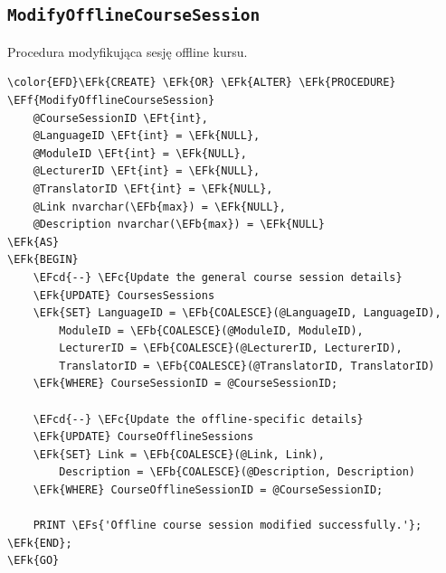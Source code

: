 \documentclass[11pt]{article}
\newcommand{\EFc}[1]{\textcolor{EFc}{\textit{#1}}} %
\newcommand{\EFcd}[1]{\textcolor{EFcd}{\textit{#1}}} %
\newcommand{\EFs}[1]{\textcolor{EFs}{#1}} %
\newcommand{\EFk}[1]{\textcolor{EFk}{\textbf{#1}}} %
\newcommand{\EFb}[1]{\textcolor{EFb}{\textbf{#1}}} %
\newcommand{\EFf}[1]{\textcolor{EFf}{#1}} %
\newcommand{\EFt}[1]{\textcolor{EFt}{\textbf{#1}}} %
\begin{document}
\subsection{\texttt{ModifyOfflineCourseSession}}
\label{sec:org8d60cca}
Procedura modyfikująca sesję offline kursu.
\begin{Code}
\begin{Verbatim}
\color{EFD}\EFk{CREATE} \EFk{OR} \EFk{ALTER} \EFk{PROCEDURE} \EFf{ModifyOfflineCourseSession}
    @CourseSessionID \EFt{int},
    @LanguageID \EFt{int} = \EFk{NULL},
    @ModuleID \EFt{int} = \EFk{NULL},
    @LecturerID \EFt{int} = \EFk{NULL},
    @TranslatorID \EFt{int} = \EFk{NULL},
    @Link nvarchar(\EFb{max}) = \EFk{NULL},
    @Description nvarchar(\EFb{max}) = \EFk{NULL}
\EFk{AS}
\EFk{BEGIN}
    \EFcd{--} \EFc{Update the general course session details}
    \EFk{UPDATE} CoursesSessions
    \EFk{SET} LanguageID = \EFb{COALESCE}(@LanguageID, LanguageID),
        ModuleID = \EFb{COALESCE}(@ModuleID, ModuleID),
        LecturerID = \EFb{COALESCE}(@LecturerID, LecturerID),
        TranslatorID = \EFb{COALESCE}(@TranslatorID, TranslatorID)
    \EFk{WHERE} CourseSessionID = @CourseSessionID;

    \EFcd{--} \EFc{Update the offline-specific details}
    \EFk{UPDATE} CourseOfflineSessions
    \EFk{SET} Link = \EFb{COALESCE}(@Link, Link),
        Description = \EFb{COALESCE}(@Description, Description)
    \EFk{WHERE} CourseOfflineSessionID = @CourseSessionID;

    PRINT \EFs{'Offline course session modified successfully.'};
\EFk{END};
\EFk{GO}
\end{Verbatim}
\end{Code}
\end{document}
